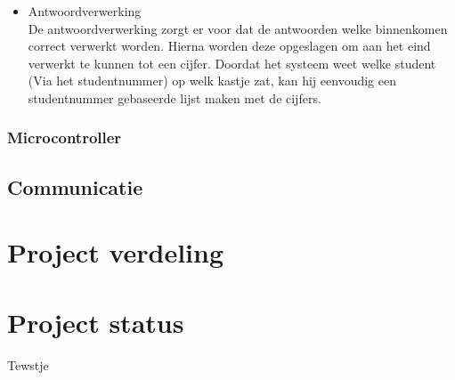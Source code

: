 \documentclass[a4paper,titlepage]{artikel1}
\begin{document}
\begin{itemize}
  \item Antwoordverwerking \\
    De antwoordverwerking zorgt er voor dat de antwoorden welke binnenkomen correct verwerkt worden. Hierna worden deze opgeslagen om aan het eind verwerkt te kunnen tot een cijfer. Doordat het systeem weet welke student (Via het studentnummer) op welk kastje zat, kan hij eenvoudig een studentnummer gebaseerde lijst maken met de cijfers. 
\end{itemize}
\subsubsection{Microcontroller}
\subsection{Communicatie}
\section{Project verdeling}

\section{Project status}

\begin{thebibliography}{xxxxx}
Tewstje
\end{thebibliography}
\end{document}
